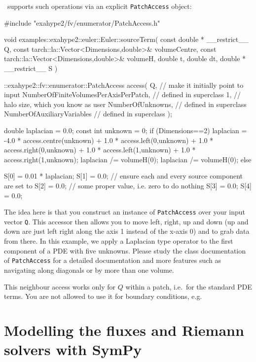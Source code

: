 \noindent
\ExaHyPE\ supports such operations via an explicit \texttt{PatchAccess} object:

\begin{code}
#include "exahype2/fv/enumerator/PatchAccess.h"


void examples::exahype2::euler::Euler::sourceTerm(
  const double * __restrict__ Q,
  const tarch::la::Vector<Dimensions,double>&  volumeCentre,
  const tarch::la::Vector<Dimensions,double>&  volumeH,
  double                                       t,
  double                                       dt,
  double * __restrict__ S
) {
  ::exahype2::fv::enumerator::PatchAccess access(
    Q,                         // make it initially point to input
    NumberOfFiniteVolumesPerAxisPerPatch, // defined in superclass
    1,                         // halo size, which you know as user
    NumberOfUnknowns,          // defined in superclass
    NumberOfAuxiliaryVariables // defined in superclass
  );

  double laplacian = 0.0;
  const int unknown = 0;
  if (Dimensions==2) {
    laplacian = -4.0 * access.centre(unknown)
      + 1.0 * access.left(0,unknown)
      + 1.0 * access.right(0,unknown)
      + 1.0 * access.left(1,unknown)
      + 1.0 * access.right(1,unknown);
    laplacian /= volumeH(0);
    laplacian /= volumeH(0);
  }
  else {
  }

  S[0] = 0.01 * laplacian;
  S[1] = 0.0; // ensure each and every source component are set to
  S[2] = 0.0; // some proper value, i.e. zero to do nothing
  S[3] = 0.0;
  S[4] = 0.0;
}
\end{code}

\noindent
The idea here is that you construct an instance of \texttt{PatchAccess} over your input vector \texttt{Q}.
This accessor then allows you to move left, right, up and down (up and down are just left right along the axis 1 instead of the x-axis 0) and to grab data from there.
In this example, we apply a Laplacian type operator to the first component of a PDE with five unknowns.
Please study the class documentation of \texttt{PatchAccess} for a detailed documentation and more features
such as navigating along diagonals or by more than one volume.


\begin{remark}
 This neighbour access works only for $Q$ within a patch, i.e.~for the standard PDE terms.
 You are not allowed to use it for boundary conditions, e.g. 
\end{remark}


\section{Modelling the fluxes and Riemann solvers with SymPy}

